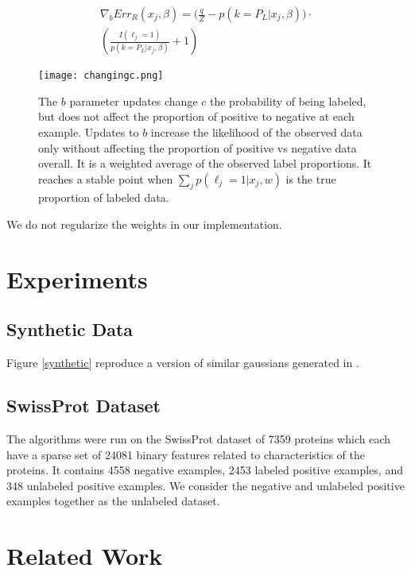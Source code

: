\documentclass{article}
\begin{document}
\begin{eqnarray*}
\nabla_{b}{Err_R (x_j, \beta)}  = \Big( \frac{q}{Z} - p(k=P_L | x_j,\beta) \Big) \cdot \\
	\left( 
		\frac{I(\ell_j=1)}{p(k=P_L | x_j,\beta)} + 1 
	  \right)
\end{eqnarray*}

\begin{figure}[ht!]
\vskip 0.2in
\begin{center}
\centerline{\texttt{[image: changingc.png]}}
\caption{The $b$ parameter updates change $c$ the probability of being labeled, but does not affect the proportion of positive to negative at each example. Updates to $b$ increase the likelihood of the observed data only without affecting the proportion of positive vs negative data overall. It is a weighted average of the observed label proportions.  It reaches a stable point when $\sum_{j}{p(\ell_j=1|x_j,w)}$ is the true proportion of labeled data.}
\label{changingc}
\end{center}
\vskip -0.2in
\end{figure}

We do not regularize the weights in our implementation.

\section{Experiments}

\subsection{Synthetic Data}

Figure \ref{synthetic} reproduce a version of similar gaussians generated in \cite{elkan08}. 

\subsection{SwissProt Dataset}

The algorithms were run on the SwissProt \cite{elkan08} dataset of 7359 proteins which each have a sparse set of 24081 binary features related to characteristics of the proteins. It contains 4558 negative examples, 2453 labeled positive examples, and 348 unlabeled positive examples.   We consider the negative and unlabeled positive examples together as the unlabeled dataset.

\section{Related Work}
\end{document}
